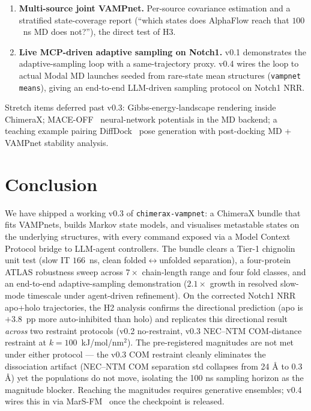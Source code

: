 \documentclass[11pt]{article}
\begin{document}
\begin{enumerate}[leftmargin=*,itemsep=4pt]
        BioEmu~\cite{lewis2026bioemu} checkpoints from HuggingFace
        on Modal (\texttt{md/alphaflow\_modal.py} is the draft
        Modal app), and produces NPZ outputs that
        \texttt{vampnet load\_ensemble} already consumes natively.
        This is the input to H3 alongside MarS-FM.
  \item \textbf{Multi-source joint VAMPnet.} Per-source covariance
        estimation and a stratified state-coverage report
        (``which states does AlphaFlow reach that $100$~ns MD does
        not?''), the direct test of H3.
  \item \textbf{Live MCP-driven adaptive sampling on Notch1.} v0.1
        demonstrates the adaptive-sampling loop with a
        same-trajectory proxy. v0.4 wires the loop to actual Modal
        MD launches seeded from rare-state mean structures
        (\texttt{vampnet means}), giving an end-to-end LLM-driven
        sampling protocol on Notch1 NRR.
\end{enumerate}

Stretch items deferred past v0.3: Gibbs-energy-landscape rendering
inside ChimeraX; MACE-OFF~\cite{batatia2022mace} neural-network
potentials in the MD backend; a teaching example pairing
DiffDock~\cite{corso2023diffdock} pose generation with
post-docking MD + VAMPnet stability analysis.


\section{Conclusion}

We have shipped a working v0.3 of \texttt{chimerax-vampnet}: a
ChimeraX bundle that fits VAMPnets, builds Markov state models, and
visualises metastable states on the underlying structures, with every
command exposed via a Model Context Protocol bridge to LLM-agent
controllers. The bundle clears a Tier-1 chignolin unit test
(slow IT $166$~ns, clean folded$\leftrightarrow$unfolded separation), a
four-protein ATLAS robustness sweep across $7\!\times$ chain-length
range and four fold classes, and an end-to-end adaptive-sampling
demonstration ($2.1\!\times$ growth in resolved slow-mode timescale
under agent-driven refinement). On the corrected Notch1 NRR
apo+holo trajectories, the H2 analysis confirms the directional
prediction (apo is $+3.8$~pp more auto-inhibited than holo) and
replicates this directional result \emph{across} two restraint
protocols (v0.2 no-restraint, v0.3 NEC--NTM COM-distance restraint
at $k=100$~kJ/mol/nm$^2$). The pre-registered magnitudes are not
met under either protocol --- the v0.3 COM restraint cleanly
eliminates the dissociation artifact (NEC--NTM COM separation std
collapses from 24 \AA{} to 0.3 \AA{}) yet the populations do not
move, isolating the 100 ns sampling horizon as the magnitude
blocker. Reaching the magnitudes requires generative ensembles;
v0.4 wires this in via MarS-FM~\cite{kapusniak2025marsfm} once the
checkpoint is released.
\end{document}
